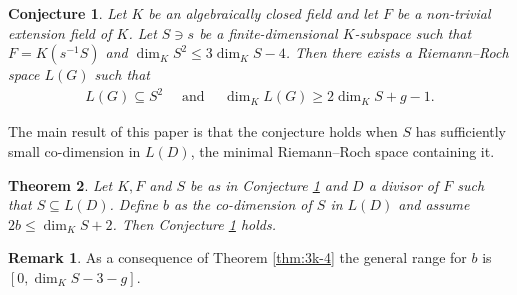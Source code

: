 \documentclass[12pt]{amsart}
\renewcommand{\leq}{\leqslant}
\renewcommand{\geq}{\geqslant}
\newtheorem{theoremx}{Theorem}
\newtheorem{conjecturex}[theoremx]{Conjecture}
\theoremstyle{definition}
\newtheorem{remark}[theorem]{Remark}
\begin{document}
	\begin{conjecturex}\label{Conj:main}
		Let $K$ be an algebraically closed field and let $F$ be a non-trivial extension field of $K$. Let $S \ni s$ be a finite-dimensional $K$-subspace such that $F = K(s^{-1}S)$ and $\dim_K S^2 \leq 3\dim_K S - 4$. Then there exists a Riemann--Roch space $L(G)$ such that 
		\begin{align*}
			L(G) \subseteq S^2 \quad \text{ and } \quad \dim_K L(G) \geq 2\dim_K S + g - 1. 
		\end{align*}
	\end{conjecturex}
	
	The main result of this paper is that the conjecture holds when $S$ has sufficiently small co-dimension in $L(D)$, the minimal Riemann--Roch space containing it. 
	
	\begin{theoremx}\label{Thm:main}
		Let $K, F$ and $S$ be as in Conjecture \ref{Conj:main} and $D$ a divisor of $F$ such that $S \subseteq L(D)$. Define $b$ as the co-dimension of $S$ in $L(D)$ and assume $2b \leq \dim_K S + 2$. Then Conjecture \ref{Conj:main} holds. 
	\end{theoremx}
	\begin{remark}
		As a consequence of Theorem \ref{thm:3k-4} the general range for $b$ is $[0, \dim_KS - 3 - g]$. 
	\end{remark}
	
\end{document}
